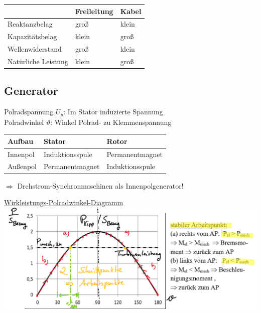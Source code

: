 
\begin{center}
\begin{tabular}[h]{l|l|l|}
    & Freileitung & Kabel\\
    \hline
Reaktanzbelag & groß & klein\\
    \hline
Kapazitätsbelag & klein & groß \\
\hline
Wellenwiderstand & groß & klein \\
\hline
Natürliche Leistung & klein & groß
\end{tabular}
\end{center}

\subsection{Generator}

Polradspannung $U_p$: Im Stator induzierte Spannung\\
Polradwinkel $\vartheta$: Winkel Polrad- zu Klemmenspannung

\begin{tabular}[h]{|l|l|l|}
    \hline
    Aufbau & Stator & Rotor\\
    \hline
    Innenpol & Induktionsspule & Permanentmagnet\\
    \hline
    Außenpol & Permanentmagnet & Induktionsspule\\
    \hline
\end{tabular}

$\Rightarrow$ Drehstrom-Synchronmaschinen als Innenpolgenerator!


\ul{Wirkleistungs-Polradwinkel-Diagramm}
\includegraphics[width=1.0 \columnwidth]{figures/wirkleistungs_diagramm.png}


